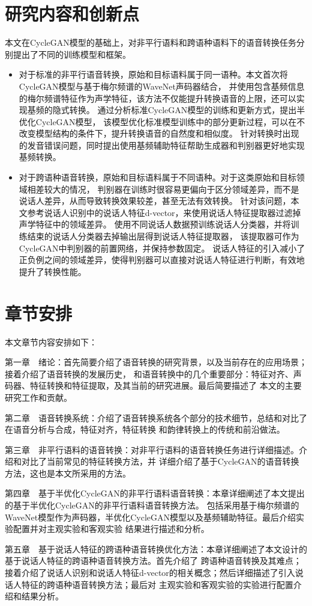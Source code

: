 \section{研究内容和创新点}
本文在CycleGAN模型的基础上，对非平行语料和跨语种语料下的语音转换任务分别提出了不同的训练模型和框架。

\begin{itemize}
    \item 对于标准的非平行语音转换，原始和目标语料属于同一语种。本文首次将CycleGAN模型与基于梅尔频谱的WaveNet声码器结合，
    并使用包含基频信息的梅尔频谱特征作为声学特征，该方法不仅能提升转换语音的上限，还可以实现基频的隐式转换。
    通过分析标准CycleGAN模型的训练和更新方式，提出半优化CycleGAN模型，
    该模型优化标准模型训练中的部分更新过程，可以在不改变模型结构的条件下，提升转换语音的自然度和相似度。
    针对转换时出现的发音错误问题，同时提出使用基频辅助特征帮助生成器和判别器更好地实现基频转换。
    \item 对于跨语种语音转换，原始和目标语料属于不同语种。对于这类原始和目标领域相差较大的情况，
    判别器在训练时很容易更偏向于区分领域差异，而不是说话人差异，从而导致转换效果较差，甚至无法有效转换。
    针对该问题，本文参考说话人识别中的说话人特征d-vector，来使用说话人特征提取器过滤掉声学特征中的领域差异。
    使用不同说话人数据预训练说话人分类器，并将训练结束的说话人分类器去掉输出层得到说话人特征提取器，
    该提取器可作为CycleGAN中判别器的前置网络，并保持参数固定。
    说话人特征的引入减小了正负例之间的领域差异，使得判别器可以直接对说话人特征进行判断，有效地提升了转换性能。
\end{itemize}


\section{章节安排}
本文章节内容安排如下：

第一章　绪论：首先简要介绍了语音转换的研究背景，以及当前存在的应用场景；接着介绍了语音转换的发展历史，
和语音转换中的几个重要部分：特征对齐、声码器、特征转换和特征提取，及其当前的研究进展。最后简要描述了
本文的主要研究工作和贡献。

第二章　语音转换系统：介绍了语音转换系统各个部分的技术细节，总结和对比了在语音分析与合成，特征对齐，特征转换
和韵律转换上的传统和前沿做法。

第三章　非平行语料的语音转换：对非平行语料的语音转换任务进行详细描述。介绍和对比了当前常见的特征转换方法，并
详细介绍了基于CycleGAN的语音转换方法，这也是本文所采用的方法。

第四章　基于半优化CycleGAN的非平行语料语音转换：本章详细阐述了本文提出的基于半优化CycleGAN的非平行语料语音转换方法。
包括采用基于梅尔频谱的WaveNet模型作为声码器，半优化CycleGAN模型以及基频辅助特征。最后介绍实验配置并对主观实验和客观实验
结果进行描述和分析。

第五章　基于说话人特征的跨语种语音转换优化方法：本章详细阐述了本文设计的基于说话人特征的跨语种语音转换方法。首先介绍了
跨语种语音转换及其难点；接着介绍了说话人识别和说话人特征d-vector的相关概念；然后详细描述了引入说话人特征的跨语种语音转换方法；最后对
主观实验和客观实验的实验进行配置介绍和结果分析。

